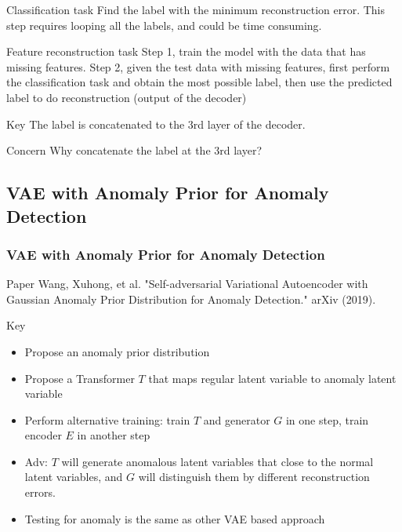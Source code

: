 \documentclass{beamer}
\begin{document}
\begin{frame}
\begin{frame}
\begin{frame}
\begin{frame}
\begin{frame}
\begin{block}{Classification task}
Find the label with the minimum reconstruction error.
This step requires looping all the labels, and could be time consuming.
\end{block}

\begin{block}{Feature reconstruction task}
Step 1, train the model with the data that has missing features. Step 2, given the test data with missing features, first perform the classification task and obtain the most possible label, then use the predicted label to do reconstruction (output of the decoder)
\end{block}

\begin{block}{Key}
The label is concatenated to the 3rd layer of the decoder.
\end{block}

\begin{block}{Concern}
Why concatenate the label at the 3rd layer?
\end{block}

\end{frame}


\subsection{VAE with Anomaly Prior for Anomaly Detection}
\begin{frame}
\frametitle{VAE with Anomaly Prior for Anomaly Detection}
\begin{block}{Paper}
Wang, Xuhong, et al. "Self-adversarial Variational Autoencoder with Gaussian Anomaly Prior Distribution for Anomaly Detection." arXiv (2019).
\end{block}

\begin{block}{Key}
\begin{itemize}
\setlength\itemsep{0em}
\item Propose an anomaly prior distribution
\item Propose a Transformer $T$ that maps regular latent variable to anomaly latent variable
\item Perform alternative training: train $T$ and generator $G$ in one step, train encoder $E$ in another step
\item Adv: $T$ will generate anomalous latent variables that close to the normal latent variables, and $G$ will distinguish them by different reconstruction errors.
\item Testing for anomaly is the same as other VAE based approach
\end{itemize}
\end{block}
\end{frame}


\end{frame}
\end{frame}
\end{frame}
\end{frame}
\end{document}
